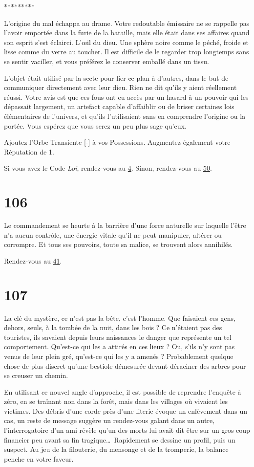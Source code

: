 \documentclass{report}
\newcommand{\gsection}[1]{
    \section{#1}
    \label{section-#1}
}
\newcommand{\glink}[1]{\hyperref[section-#1]{#1}}
\newcommand{\ellipse}{
    \begin{center}
        *********
    \end{center}
}
\begin{document}
\ellipse

L'origine du mal échappa au drame. Votre redoutable émissaire ne se rappelle pas l'avoir emportée dans la furie de la bataille, mais elle était dans ses affaires quand son esprit s'est éclairci. L’œil du dieu. Une sphère noire comme le péché, froide et lisse comme du verre au toucher. Il est difficile de le regarder trop longtemps sans se sentir vaciller, et vous préférez le conserver emballé dans un tissu.

L'objet était utilisé par la secte pour lier ce plan à d'autres, dans le but de communiquer directement avec leur dieu. Rien ne dit qu'ils y aient réellement réussi. Votre avis est que ces fous ont eu accès par un hasard à un pouvoir qui les dépassait largement, un artefact capable d'affaiblir ou de briser certaines lois élémentaires de l'univers, et qu'ils l'utilisaient sans en comprendre l'origine ou la portée. Vous espérez que vous serez un peu plus sage qu'eux.

Ajoutez l'Orbe Transiente [-] à vos Possessions. Augmentez également votre Réputation de 1.

Si vous avez le Code \emph{Loi}, rendez-vous au \glink{4}. Sinon, rendez-vous au \glink{50}.

\gsection{106}

Le commandement se heurte à la barrière d'une force naturelle sur laquelle l'être n'a aucun contrôle, une énergie vitale qu'il ne peut manipuler, altérer ou corrompre. Et tous ses pouvoirs, toute sa malice, se trouvent alors annihilés.

Rendez-vous au \glink{41}.

\gsection{107}

La clé du mystère, ce n'est pas la bête, c'est l'homme. Que faisaient ces gens, dehors, seuls, à la tombée de la nuit, dans les bois ? Ce n'étaient pas des touristes, ils savaient depuis leurs naissances le danger que représente un tel comportement. Qu'est-ce qui les a attirés en ces lieux ? Ou, s'ils n'y sont pas venus de leur plein gré, qu'est-ce qui les y a amenés ? Probablement quelque chose de plus discret qu'une bestiole démesurée devant déraciner des arbres pour se creuser un chemin.

En utilisant ce nouvel angle d'approche, il est possible de reprendre l'enquête à zéro, en se traînant non dans la forêt, mais dans les villages où vivaient les victimes. Des débris d'une corde près d'une literie évoque un enlèvement dans un cas, un reste de message suggère un rendez-vous galant dans un autre, l'interrogatoire d'un ami révèle qu'un des morts lui avait dit être sur un gros coup financier peu avant sa fin tragique\dots~Rapidement se dessine un profil, puis un suspect. Au jeu de la filouterie, du mensonge et de la tromperie, la balance penche en votre faveur.
\end{document}
